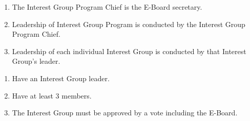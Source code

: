 \begin{enumerate}
  \item The Interest Group Program Chief is the E-Board secretary.
  \item Leadership of Interest Group Program is conducted by the Interest Group
    Program Chief.
  \item Leadership of each individual Interest Group is conducted by that
    Interest Group's leader.
\end{enumerate}


\begin{enumerate}
  \item Have an Interest Group leader.
  \item Have at least 3 members.
  \item The Interest Group must be approved by a vote including the E-Board.
\end{enumerate}